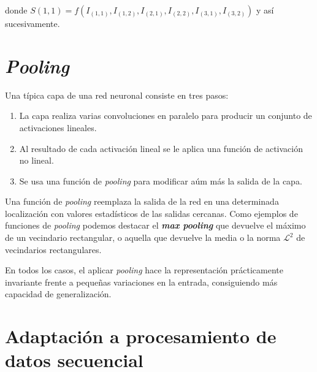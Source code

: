 	donde $S(1,1) = f(I_{(1,1)}, I_{(1,2)}, I_{(2,1)}, I_{(2,2)}, I_{(3,1)}, I_{(3,2)})$ y así sucesivamente.
	
	\section{\textit{Pooling}}
	
	Una típica capa de una red neuronal consiste en tres pasos:
	
	\begin{enumerate}
		\item La capa realiza varias convoluciones en paralelo para producir un conjunto de activaciones lineales.
		\item Al resultado de cada activación lineal se le aplica una función de activación no lineal. 
		\item Se usa una función de \textit{pooling} para modificar aúm más la salida de la capa.
	\end{enumerate}

	Una función de \textit{pooling} reemplaza la salida de la red en una determinada localización con valores estadísticos de las salidas cercanas. Como ejemplos de funciones de \textit{pooling} podemos destacar el \textbf{\textit{max pooling}} que devuelve el máximo de un vecindario rectangular, o aquella que devuelve la media o la norma $\mathcal{L}^2$ de vecindarios rectangulares.
	
	En todos los casos, el aplicar \textit{pooling} hace la representación prácticamente invariante frente a pequeñas variaciones en la entrada, consiguiendo más capacidad de generalización. 
	
	\section{Adaptación a procesamiento de datos secuencial}	
	
